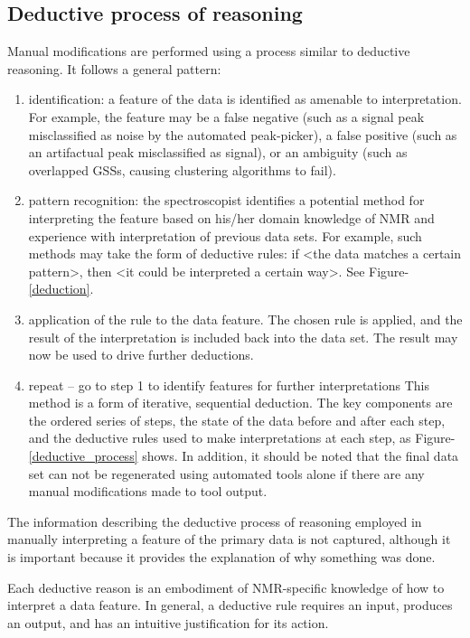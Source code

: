 \subsection{Deductive process of reasoning}
Manual modifications are performed using a process similar to deductive 
reasoning.  It follows a general pattern:
\begin{enumerate}
  \item identification: a feature of the data is identified as amenable to 
    interpretation.  For example, the feature may be a false negative (such as 
    a signal peak misclassified as noise by the automated peak-picker), a false 
    positive (such as an artifactual peak misclassified as signal), or an 
    ambiguity (such as overlapped GSSs, causing clustering algorithms to fail).
  \item pattern recognition: the spectroscopist identifies a potential method 
    for interpreting the feature based on his/her domain knowledge of NMR and 
    experience with interpretation of previous data sets.  For example, such 
    methods may take the form of deductive rules:  if <the data matches a 
    certain pattern>, then <it could be interpreted a certain way>. 
    See Figure-\ref{deduction}.
  \item application of the rule to the data feature.  The chosen rule is 
    applied, and the result of the interpretation is included back into the 
    data set.  The result may now be used to drive further deductions.
  \item repeat -- go to step 1 to identify features for further interpretations
    This method is a form of iterative, sequential deduction.  The key components 
    are the ordered series of steps, the state of the data before and after each 
    step, and the deductive rules used to make interpretations at each step, as
    Figure-\ref{deductive_process} shows.  In 
    addition, it should be noted that the final data set can not be regenerated 
    using automated tools alone if there are any manual modifications made to 
    tool output.
\end{enumerate}

The information describing the deductive process of reasoning employed in 
manually interpreting a feature of the primary data is not captured, although
it is important because it provides the explanation 
of why something was done.

Each deductive reason is an embodiment of NMR-specific knowledge of how to 
interpret a data feature.  In general, a deductive rule requires an input, 
produces an output, and has an intuitive justification for its action.

